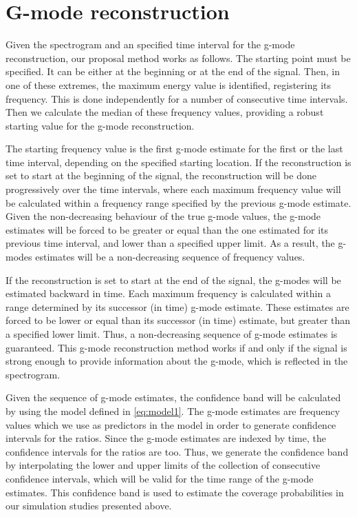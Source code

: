 \section{G-mode reconstruction}
\label{app:gmode}
Given the spectrogram and an specified time interval for the g-mode reconstruction, our proposal method works as follows.  The starting point must be specified.  It can be either at the beginning or at the end of the signal.  Then, in one of these extremes, the maximum energy value is identified, registering its frequency.  This is done independently for a number of consecutive time intervals.  Then we calculate the median of these frequency values, providing a robust starting value for the g-mode reconstruction.

The starting frequency value is the first g-mode estimate for the first or the last time interval, depending on the specified starting location.  If the reconstruction is set to start at the beginning of the signal, the reconstruction will be done progressively over the time intervals, where each maximum frequency value will be calculated within a frequency range specified by the previous g-mode estimate.  Given the non-decreasing behaviour of the true g-mode values, the g-mode estimates will be forced to be greater or equal than the one estimated for its previous time interval, and lower than a specified upper limit.  As a result, the g-modes estimates will be a non-decreasing sequence of frequency values. 

If the reconstruction is set to start at the end of the signal, the g-modes will be estimated backward in time.  Each maximum frequency is calculated within a range determined by its successor (in time) g-mode estimate.  These estimates are forced to be lower or equal than its successor (in time) estimate, but greater than a specified lower limit. Thus, a non-decreasing sequence of g-mode estimates is guaranteed.
This g-mode reconstruction method works if and only if the signal is strong enough to provide information about the g-mode, which is reflected in the spectrogram.


Given the sequence of g-mode estimates, the confidence band will be calculated by using the model defined in \eqref{eq:model1}. The g-mode estimates are frequency values which we use as predictors in the model in order to generate confidence intervals for the ratios. Since the g-mode estimates are indexed by time, the confidence intervals for the ratios are too.  Thus, we generate the confidence band by interpolating the lower and upper limits of the collection of consecutive confidence intervals, which will be valid for the time range of the g-mode estimates.  This confidence band is used to estimate the coverage probabilities in our simulation studies presented above.  
